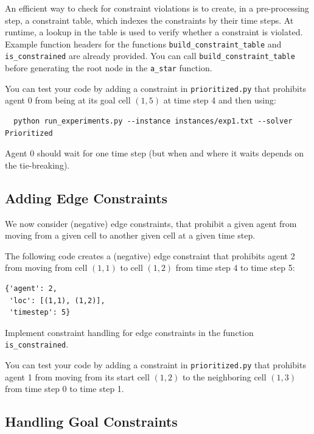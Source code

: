 \documentclass[11pt]{article}
\begin{document}
An efficient way to check for constraint violations is to create, in a pre-processing step, a constraint table, which indexes the constraints by their time steps. At runtime, a lookup in the table is used to verify whether a constraint is violated. Example function headers for the functions \texttt{build_constraint_table} and \texttt{is_constrained} are already provided. You can call \texttt{build_constraint_table} before generating the root node in the \texttt{a_star} function.

You can test your code by adding a constraint in \texttt{prioritized.py} that prohibits agent 0 from being at its goal cell $(1,5)$ at time step 4 and then using:

\begin{verbatim}
  python run_experiments.py --instance instances/exp1.txt --solver Prioritized
\end{verbatim}

Agent 0 should wait for one time step (but when and where it waits depends on the tie-breaking).

\subsection{Adding Edge Constraints}

We now consider (negative) edge constraints, that prohibit a given agent from moving from a given cell to another given cell at a given time step.

The following code creates a (negative) edge constraint that prohibits agent 2 from moving from cell $(1,1)$ to cell $(1,2)$ from time step 4 to time step 5:

\begin{verbatim}
{'agent': 2,
 'loc': [(1,1), (1,2)],
 'timestep': 5}
\end{verbatim}

Implement constraint handling for edge constraints in the function \texttt{is_constrained}.

You can test your code by adding a constraint in \texttt{prioritized.py} that prohibits agent 1 from moving from its start cell $(1,2)$ to the neighboring cell $(1,3)$ from time step 0 to time step 1.

\subsection{Handling Goal Constraints}
\end{document}
